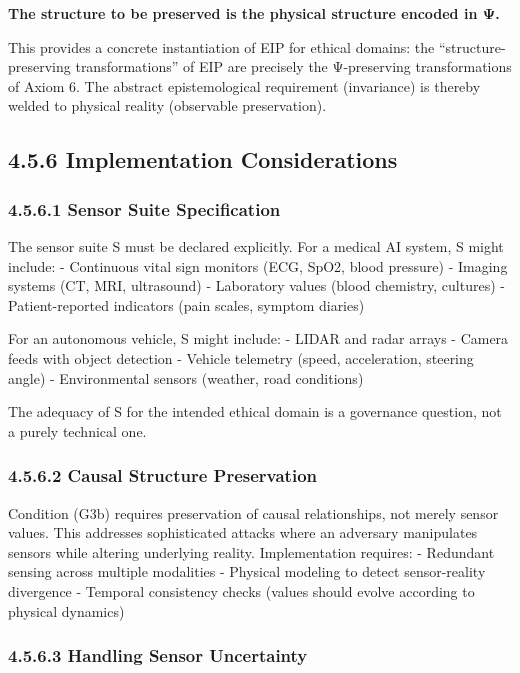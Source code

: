 \documentclass[12pt]{article}
\theoremstyle{plain}
\theoremstyle{definition}
\theoremstyle{remark}
\begin{document}
\textbf{The structure to be preserved is the physical structure encoded
in Ψ.}

This provides a concrete instantiation of EIP for ethical domains: the
``structure-preserving transformations'' of EIP are precisely the
Ψ-preserving transformations of Axiom 6. The abstract epistemological
requirement (invariance) is thereby welded to physical reality
(observable preservation).

\subsection{4.5.6 Implementation
Considerations}\label{implementation-considerations}

\subsubsection{4.5.6.1 Sensor Suite
Specification}\label{sensor-suite-specification}

The sensor suite S must be declared explicitly. For a medical AI system,
S might include: - Continuous vital sign monitors (ECG, SpO2, blood
pressure) - Imaging systems (CT, MRI, ultrasound) - Laboratory values
(blood chemistry, cultures) - Patient-reported indicators (pain scales,
symptom diaries)

For an autonomous vehicle, S might include: - LIDAR and radar arrays -
Camera feeds with object detection - Vehicle telemetry (speed,
acceleration, steering angle) - Environmental sensors (weather, road
conditions)

The adequacy of S for the intended ethical domain is a governance
question, not a purely technical one.

\subsubsection{4.5.6.2 Causal Structure
Preservation}\label{causal-structure-preservation}

Condition (G3b) requires preservation of causal relationships, not
merely sensor values. This addresses sophisticated attacks where an
adversary manipulates sensors while altering underlying reality.
Implementation requires: - Redundant sensing across multiple modalities
- Physical modeling to detect sensor-reality divergence - Temporal
consistency checks (values should evolve according to physical dynamics)

\subsubsection{4.5.6.3 Handling Sensor
Uncertainty}\label{handling-sensor-uncertainty}
\end{document}
